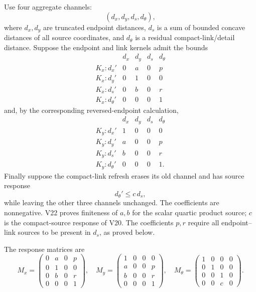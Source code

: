 \documentclass[11pt]{article}
\theoremstyle{remark}
\begin{document}
Use four aggregate channels:
\[
 (d_x,d_y,d_s,d_\theta),                                   \tag{23.7}
\]
where \(d_x,d_y\) are truncated endpoint distances,
\(d_s\) is a sum of bounded concave distances of all source
coordinates, and \(d_\theta\) is a residual compact-link/detail
distance.  Suppose the endpoint and link kernels admit the bounds
\[
\begin{array}{c|cccc}
 &d_x&d_y&d_s&d_\theta\\ \hline
 K_x:d_x'&0&a&0&p\\
 K_x:d_y'&0&1&0&0\\
 K_x:d_s'&0&b&0&r\\
 K_x:d_\theta'&0&0&0&1
\end{array}                                                 \tag{23.8}
\]
and, by the corresponding reversed-endpoint calculation,
\[
\begin{array}{c|cccc}
 &d_x&d_y&d_s&d_\theta\\ \hline
 K_y:d_x'&1&0&0&0\\
 K_y:d_y'&a&0&0&p\\
 K_y:d_s'&b&0&0&r\\
 K_y:d_\theta'&0&0&0&1.
\end{array}                                                 \tag{23.9}
\]
Finally suppose the compact-link refresh erases its old channel and
has source response
\[
 d_\theta'\le c\,d_s,                                      \tag{23.10}
\]
while leaving the other three channels unchanged.  The coefficients
are nonnegative.  V22 proves finiteness of \(a,b\) for the scalar
quartic product source; \(c\) is the compact-source response of V20.
The coefficients \(p,r\) require all endpoint--link sources to be
present in \(d_s\), as proved below.

The response matrices are
\[
 M_x=
 \begin{pmatrix}
 0&a&0&p\\
 0&1&0&0\\
 0&b&0&r\\
 0&0&0&1
 \end{pmatrix},
\quad
 M_y=
 \begin{pmatrix}
 1&0&0&0\\
 a&0&0&p\\
 b&0&0&r\\
 0&0&0&1
 \end{pmatrix},
\quad
 M_\theta=
 \begin{pmatrix}
 1&0&0&0\\
 0&1&0&0\\
 0&0&1&0\\
 0&0&c&0
 \end{pmatrix}.                                            \tag{23.11}
\]
\end{document}
